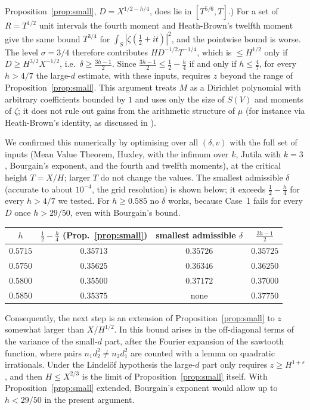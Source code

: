 \documentclass[11pt]{amsart}
\theoremstyle{remark}
\newcommand{\eps}{\varepsilon}
\begin{document}
Proposition~\ref{prop:small}, $D=X^{1/2-h/4}$, does lie in $[T^{5/6},T]$.)  For a
set of $R=T^{1/2}$ unit intervals the fourth moment and
Heath-Brown's twelfth moment \cite{HB} give the same bound $T^{3/4}$ for
$\int_S|\zeta(\frac12+it)|^2$, and the pointwise bound is worse.  The level
$\sigma=3/4$ therefore contributes $HD^{-1/2}T^{-1/4}$, which is
$\le H^{1/2}$ only if $D\ge H^{3/2}X^{-1/2}$, i.e.\ $\delta\ge\frac{3h-1}2$.  Since
$\frac{3h-1}2\le\frac12-\frac h4$ if and only if $h\le\frac47$, for every $h>4/7$ the
large-$d$ estimate, with these inputs, requires $z$ beyond the range of
Proposition~\ref{prop:small}.  This argument treats $M$ as a Dirichlet polynomial
with arbitrary coefficients bounded by $1$ and uses only the size of $S(V)$ and
moments of $\zeta$; it does not rule out gains from the arithmetic structure of
$\mu$ (for instance via Heath-Brown's identity, as discussed in
\cite[Section~2]{GMRR}).

We confirmed this numerically by optimising over all $(\delta,v)$ with the full
set of inputs (Mean Value Theorem, Huxley, \cite[Theorem~1.1 and
Proposition~12.1]{GM} with the infimum over $k$, Jutila with $k=3$, Bourgain's
exponent, and the fourth and twelfth moments), at the critical height $T=X/H$;
larger $T$ do not change the values.  The smallest admissible $\delta$ (accurate
to about $10^{-4}$, the grid resolution) is shown below; it exceeds
$\frac12-\frac h4$ for every $h>4/7$ we tested.  For $h\ge0.585$ no $\delta$ works,
because Case~1 fails for every $D$ once $h>29/50$, even with Bourgain's bound.

\begin{center}
\begin{tabular}{cccc}
\toprule
$h$ & $\frac12-\frac h4$ (Prop.~\ref{prop:small}) & smallest admissible $\delta$ & $\frac{3h-1}2$\\
\midrule
$0.5715$ & $0.35713$ & $0.35726$ & $0.35725$\\
$0.5750$ & $0.35625$ & $0.36346$ & $0.36250$\\
$0.5800$ & $0.35500$ & $0.37172$ & $0.37000$\\
$0.5850$ & $0.35375$ & none & $0.37750$\\
\bottomrule
\end{tabular}
\end{center}

Consequently, the next step is an extension of Proposition~\ref{prop:small} to
$z$ somewhat larger than $X/H^{1/2}$.  In \cite{GMRR} this bound arises in the
off-diagonal terms of the variance of the small-$d$ part, after the
Fourier expansion of the sawtooth function, where pairs $n_1d_2^2\ne n_2d_1^2$
are counted with a lemma on quadratic irrationals.  Under the Lindel\"of hypothesis
the large-$d$ part only requires $z\ge H^{1+\eps}$, and then $H\le X^{2/3}$ is the
limit of Proposition~\ref{prop:small} itself.  With Proposition~\ref{prop:small}
extended, Bourgain's exponent would allow up to $h<29/50$ in the present
argument.
\end{document}

